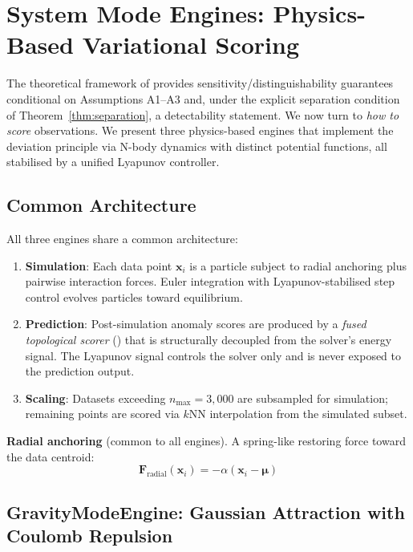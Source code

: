 \documentclass{article}
\begin{document}
\section{System Mode Engines: Physics-Based Variational Scoring}
\label{sec:gravity}

The theoretical framework of  provides sensitivity/distinguishability guarantees conditional on Assumptions A1--A3 and, under the explicit separation condition of Theorem~\ref{thm:separation}, a detectability statement. We now turn to \emph{how to score} observations. We present three physics-based engines that implement the deviation principle via N-body dynamics with distinct potential functions, all stabilised by a unified Lyapunov controller.

\subsection{Common Architecture}

All three engines share a common architecture:
\begin{enumerate}[leftmargin=*]
  \item \textbf{Simulation}: Each data point $\mathbf{x}_i$ is a particle subject to radial anchoring plus pairwise interaction forces. Euler integration with Lyapunov-stabilised step control evolves particles toward equilibrium.
  \item \textbf{Prediction}: Post-simulation anomaly scores are produced by a \emph{fused topological scorer} () that is structurally decoupled from the solver's energy signal. The Lyapunov signal controls the solver only and is never exposed to the prediction output.
  \item \textbf{Scaling}: Datasets exceeding $n_{\max} = 3{,}000$ are subsampled for simulation; remaining points are scored via $k$NN interpolation from the simulated subset.
\end{enumerate}

\textbf{Radial anchoring} (common to all engines). A spring-like restoring force toward the data centroid:
\begin{equation}
\mathbf{F}_{\text{radial}}(\mathbf{x}_i) = -\alpha(\mathbf{x}_i - \bm{\mu})
\label{eq:f_radial}
\end{equation}

\subsection{GravityModeEngine: Gaussian Attraction with Coulomb Repulsion}
\label{ssec:gravity_engine}
\end{document}
